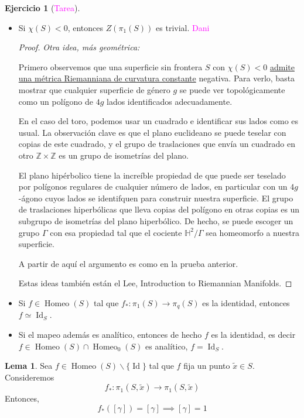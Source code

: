 \documentclass[spanish]{article}
\theoremstyle{definition}
\newtheorem*{lema}{Lema}
\newtheorem*{ejer}{Ejercicio}
\newcommand{\Z}{\mathbb{Z}}
\newcommand{\Hy}{\mathbb{H}}
\DeclareMathOperator{\Id}{Id}
\DeclareMathOperator{\Homeo}{Homeo}
\begin{document}
\begin{ejer}[\textcolor{magenta}{Tarea}]\leavevmode
	\begin{itemize}
		\item Si $\chi(S)<0$, entonces $Z(\pi_1(S))$ es trivial. \textcolor{magenta}{Dani}
	\begin{proof}\textit{Otra idea, más geométrica:}
			
			Primero observemos que una superficie sin frontera $S$ con $\chi(S)<0$ \href{https://mathoverflow.net/questions/14548/finding-constant-curvature-metrics-on-surfaces-without-full-power-of-uniformiza}{admite una métrica Riemanniana de curvatura constante} negativa. Para verlo, basta mostrar que cualquier superficie de género $g$ se puede ver topológicamente como un polígono de $4g$ lados identificados adecuadamente.
			
			En el caso del toro, podemos usar un cuadrado e identificar sus lados como es usual. La observación clave es que el plano euclideano se puede teselar con copias de este cuadrado, y el grupo de traslaciones que envía un cuadrado en otro $\Z\times\Z$ es un grupo de isometrías del plano.
			
			El plano hipérbolico tiene la increíble propiedad de que puede ser teselado por polígonos regulares de cualquier número de lados, en particular con un $4g$-ágono cuyos lados se identifquen para construir nuestra superficie. El grupo de traslaciones hiperbólicas que lleva copias del polígono en otras copias es un subgrupo de isometrías del plano hiperbólico. De hecho, se puede escoger un grupo $\Gamma$ con esa propiedad tal que el cociente $\Hy^2/\Gamma$ sea homeomorfo a nuestra superficie.
			
			A partir de aquí el argumento es como en la prueba anterior.
			
			Estas ideas también están el Lee, Introduction to Riemannian Manifolds.
		\end{proof}
		\item Si $f\in\Homeo(S)$ tal que $f_*:\pi_1(S)\to\pi_q(S)$ es la identidad, entonces $f\simeq\Id_S$.
		\item Si el mapeo además es analítico, entonces de hecho $f$ es la identidad, es decir $f\in\Homeo(S)\cap\Homeo_0(S)$ es analítico, $f=\Id_S$.
	\end{itemize}
\end{ejer}
\begin{lema}
	Sea $f\in\Homeo(S)\backslash\{\Id\}$ tal que $f$ fija un punto $\tilde{x}\in S$. Consideremos \[f_*:\pi_1(S,\tilde{x})\to\pi_1(S,\tilde{x})\]
	Entonces,
	\[f_*([\gamma])=[\gamma]\implies[\gamma]=1\]
\end{lema}
\end{document}
